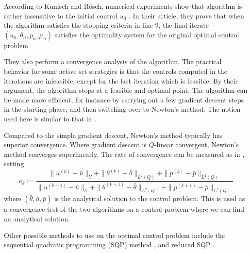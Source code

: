 According to Kunisch and Rösch, numerical experiments show that algorithm is rather insensitive to the initial control $u_0$ \cite{primal_dual}. In their article, they prove that when the algorithm satisfies the stopping criteria in line 9, the final iterate $(u_n, \theta_n, p_n, \mu_n)$ satisfies the optimality system for the original optimal control problem.

They also perform a convergence analysis of the algorithm. The practical behavior for some active set strategies is that the controls computed in the iterations are infeasible, except for the last iteration which is feasible. By their argument, the algorithm stops at a feasible and optimal point. The algorithm can be made more efficient, for instance by carrying out a few gradient descent steps in the starting phase, and then switching over to Newton's method. The notion used here is similar to that in \cite{Algorithms}.

Compared to the simple gradient descent, Newton's method typically has superior convergence. Where gradient descent is $Q$-linear convergent, Newton's method converges superlinearly.
The rate of convergence can be measured as in \cite{DPSteel}, setting 
\begin{equation}
    \label{eq:rate_of_conv}
    e_k := \frac{\|u^{(k)}-\bar{u}\|_U + \|\theta^{(k)}-\bar{\theta}\|_{L^2(Q)} +\|p^{(k)}-\bar{p}\|_{L^2(Q)} }{\|u^{(k+1)}-\bar{u}\|_U + \|\theta^{(k+1)}-\bar{\theta}\|_{L^2(Q)} +\|p^{(k+1)}-\bar{p}\|_{L^2(Q)}}
\end{equation}
where $(\bar{\theta},\bar{u},\bar{p})$ is the analytical solution to the control problem. This is used as a convergence test of the two algorithms on a control problem where we can find an analytical solution. 

Other possible methods to use on the optimal control problem include the sequential quadratic programming (SQP) method \cite{Algorithms}, and reduced SQP \cite{DPSteel}. 
